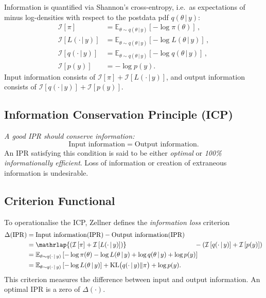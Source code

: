 \documentclass[accepted]{uai2026} %
\def\given{\,|\,}
\theoremstyle{remark}
\begin{document}
Information is quantified via Shannon's cross-entropy, i.e.\ as expectations of minus log-densities with respect to the postdata pdf $q(\theta \given y)$:
\begin{align*}
\mathcal{I}\left[\pi\right] &= \mathbb{E}_{\theta\sim q(\theta\given y)}\left[- \log \pi(\theta)\right] \, , \\
\mathcal{I}\left[L(\cdot \given y)\right] &= \mathbb{E}_{\theta\sim q(\theta\given y)}\left[- \log L(\theta \given y)\right] \, , \\
\mathcal{I}\left[q(\cdot\given y)\right] &= \mathbb{E}_{\theta\sim q(\theta\given y)}\left[- \log q(\theta \given y)\right] \, , \\
\mathcal{I}[p(y)] &= -\log p(y).
\end{align*}
Input information consists of $\mathcal{I}\left[\pi\right]+\mathcal{I}\left[L(\cdot \given y)\right]$, and output information consists of $\mathcal{I}\left[q(\cdot\given y)\right] + \mathcal{I}[p(y)]$.


\subsection*{Information Conservation Principle (ICP)}

\emph{A good IPR should conserve information:}
\[
\text{Input information} = \text{Output information}.
\]
An IPR satisfying this condition is said to be either \emph{optimal} or \emph{100\% informationally efficient}.
Loss of information or creation of extraneous information is undesirable.

\subsection*{Criterion Functional}

To operationalise the ICP, Zellner defines the \emph{information loss} criterion
\begin{align*}
\Delta(\mathrm{IPR})
& = \text{Input information}(\text{IPR}) - \text{Output information}(\text{IPR}) \\
& = \mathrlap{\left(\mathcal{I}\left[\pi\right]+\mathcal{I}\left[L(\cdot\given y)\right]\right)} \hphantom{\text{Input information}(\text{IPR})}
 -\left(\mathcal{I}\left[q(\cdot\given y)\right]+\mathcal{I}\left[p(y)\right]\right)\\
&=\mathbb{E}_{\theta\sim q(\cdot\given y)}\left[-\log\pi(\theta)-\log L(\theta \given y)+\log q(\theta\given y)+\log p(y)\right]\\
&= \mathbb{E}_{\theta\sim q(\cdot\given y)}\left[- \log L(\theta \given y)\right] + \mathrm{KL}\big(q(\cdot\given y)\|\pi\big)+\log p(y) .
\end{align*}
This criterion measures the difference between input and output information.
An optimal IPR is a zero of $\Delta(\cdot)$.
\end{document}
